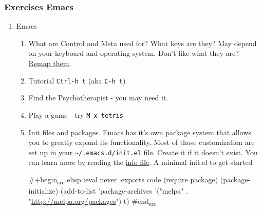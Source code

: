 \documentclass{article}
\begin{document}
\subsubsection{Exercises Emacs}
\label{sec:orgf8a5d61}
\begin{enumerate}
\item Emacs
\label{sec:org9f69051}
\begin{enumerate}
\item What are Control and Meta used for? What keys are they?
May depend on your keyboard and operating system. Don't like what they are? \href{https://www.x.org/releases/current/doc/man/man1/xmodmap.1.xhtml}{Remap them}.
\item Tutorial \texttt{Ctrl-h t} (aka \texttt{C-h t})
\item Find the Psychotherapist - you may need it.
\item Play a game - try \texttt{M-x tetris}
\item Init files and packages. 
Emacs has it's own package system that allows you to greatly expand its functionality. Most of those customization are set up in your \texttt{\textasciitilde{}/.emacs.d/init.el} file. Create it if it doesn't exist. 
You can learn more by reading the \href{emacs\#Init File}{info file}.
A minimal init.el to get started

\#+begin\textsubscript{src} elisp :eval never :exports code
(require package)
(package-initialize)
(add-to-list 'package-archives '("melpa" . "\url{http://melpa.org/packages}") t)
\#end\textsubscript{src}
\end{enumerate}



\end{enumerate}
\end{document}
